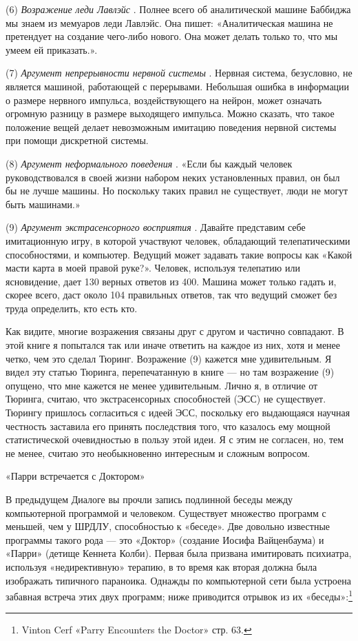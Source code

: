 (6) \emph{Возражение леди Лавлэйс} . Полнее всего об аналитической машине Баббиджа мы знаем из мемуаров леди Лавлэйс. Она пишет: «Аналитическая машина не претендует на создание чего-либо нового. Она может делать только то, что мы умеем ей приказать.».

(7) \emph{Аргумент непрерывности нервной системы} . Нервная система, безусловно, не является машиной, работающей с перерывами. Небольшая ошибка в информации о размере нервного импульса, воздействующего на нейрон, может означать огромную разницу в размере выходящего импульса. Можно сказать, что такое положение вещей делает невозможным имитацию поведения нервной системы при помощи дискретной системы.

(8) \emph{Аргумент неформального поведения} . «Если бы каждый человек руководствовался в своей жизни набором неких установленных правил, он был бы не лучше машины. Но поскольку таких правил не существует, люди не могут быть машинами.»

(9) \emph{Аргумент экстрасенсорного восприятия} . Давайте представим себе имитационную игру, в которой участвуют человек, обладающий телепатическими способностями, и компьютер. Ведущий может задавать такие вопросы как «Какой масти карта в моей правой руке?». Человек, используя телепатию или ясновидение, дает 130 верных ответов из 400. Машина может только гадать и, скорее всего, даст около 104 правильных ответов, так что ведущий сможет без труда определить, кто есть кто.

Как видите, многие возражения связаны друг с другом и частично совпадают. В этой книге я попытался так или иначе ответить на каждое из них, хотя и менее четко, чем это сделал Тюринг. Возражение (9) кажется мне удивительным. Я видел эту статью Тюринга, перепечатанную в книге --- но там возражение (9) опущено, что мне кажется не менее удивительным. Лично я, в отличие от Тюринга, считаю, что экстрасенсорных способностей (ЭСС) не существует. Тюрингу пришлось согласиться с идеей ЭСС, поскольку его выдающаяся научная честность заставила его принять последствия того, что казалось ему мощной статистической очевидностью в пользу этой идеи. Я с этим не согласен, но, тем не менее, считаю это необыкновенно интересным и сложным вопросом.

«Парри встречается с Доктором»

В предыдущем Диалоге вы прочли запись подлинной беседы между компьютерной программой и человеком. Существует множество программ с меньшей, чем у ШРДЛУ, способностью к «беседе». Две довольно известные программы такого рода --- это «Доктор» (создание Иосифа Вайценбаума) и «Парри» (детище Кеннета Колби). Первая была призвана имитировать психиатра, используя «недирективную» терапию, в то время как вторая должна была изображать типичного параноика. Однажды по компьютерной сети была устроена забавная встреча этих двух программ; ниже приводится отрывок из их «беседы»:\footnote{Vinton Cerf «Parry Encounters the Doctor» стр. 63.}

